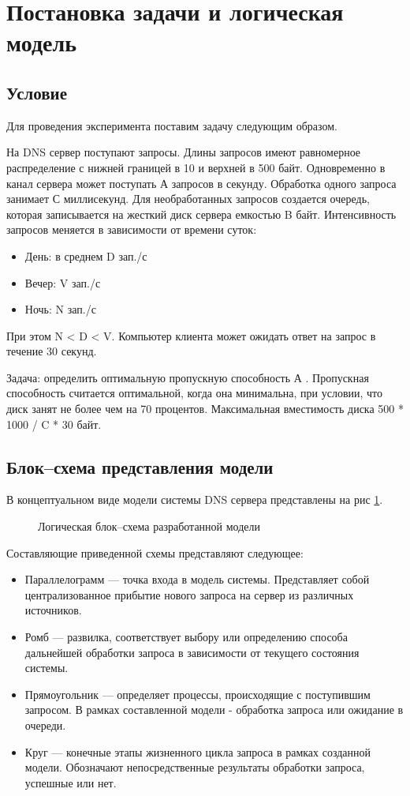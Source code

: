 \newpage
\section{Постановка задачи и логическая модель}
\subsection{Условие}
Для проведения эксперимента поставим задачу следующим образом.

На DNS сервер поступают запросы. Длины запросов имеют равномерное распределение с нижней границей
в 10 и верхней в 500 байт. Одновременно в канал сервера может поступать А запросов в секунду. Обработка одного
запроса занимает С миллисекунд. Для необработанных запросов создается очередь, которая записывается
на жесткий диск сервера емкостью B байт. Интенсивность запросов меняется в зависимости от времени суток:
\begin{itemize}
    \item День: в среднем D зап./с
    \item Вечер: V зап./с
    \item Ночь: N зап./с
\end{itemize}

При этом N < D < V. Компьютер клиента может ожидать ответ на запрос в течение 30 секунд.

Задача: определить оптимальную пропускную способность А . Пропускная способность считается оптимальной, когда она минимальна, при условии,
что диск занят не более чем на 70 процентов. Максимальная вместимость диска 500 * 1000 / C * 30  байт.

\subsection{Блок--схема представления модели}
В концептуальном виде модели системы DNS сервера представлены на рис \ref{concept}.

\begin{figure} [h]
    \caption{Логическая блок--схема разработанной модели}
    \label{concept}
\end{figure}

Составляющие приведенной схемы представляют следующее:
\begin{itemize}
    \item Параллелограмм --- точка входа в модель системы. Представляет собой
    централизованное прибытие нового запроса на сервер из различных источников.
    \item Ромб --- развилка, соответствует выбору или определению способа дальнейшей
    обработки запроса в зависимости от текущего состояния системы.
    \item Прямоугольник --- определяет процессы, происходящие с поступившим запросом.
    В рамках составленной модели - обработка запроса или ожидание в очереди.
    \item Круг --- конечные этапы жизненного цикла запроса в рамках созданной модели.
    Обозначают непосредственные результаты обработки запроса, успешные или нет.

\end{itemize}
\newpage

